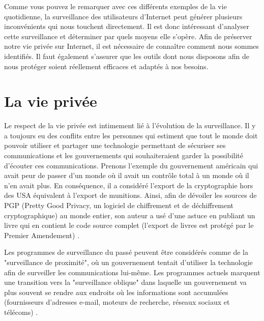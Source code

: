 Comme vous pouvez le remarquer avec ces différents exemples de la vie quotidienne, la surveillance des utilisateurs d'Internet peut générer plusieurs inconvénients qui nous touchent directement. Il est donc intéressant d'analyser cette surveillance et déterminer par quels moyens elle s'opère. Afin de préserver notre vie privée sur Internet, il est nécessaire de connaître comment nous sommes identifiés. Il faut également s'assurer que les outils dont nous disposons afin de nous protéger soient réellement efficaces et adaptés à nos besoins.


\section{La vie privée}
Le respect de la vie privée est intimement lié à l'évolution de la surveillance.
Il y a toujours eu des conflits entre les personnes qui estiment que tout le monde doit pouvoir utiliser et partager une technologie permettant de sécuriser ses communications et les gouvernements qui souhaiteraient garder la possibilité d'écouter ces communications. Prenons l'exemple du gouvernement américain qui avait peur de passer d'un monde où il avait un contrôle total à un monde où il n'en avait plus. En conséquence, il a considéré l'export de la cryptographie hors des USA équivalent à l'export de munitions. Ainsi, afin de dévoiler les sources de PGP (Pretty Good Privacy, un logiciel de chiffrement et de déchiffrement cryptographique) au monde entier, son auteur a usé d'une astuce en publiant un livre qui en contient le code source complet (l'export de livres est protégé par le Premier Amendement) \cite{youtube_moxie_marlinspike}.
\newline

Les programmes de surveillance du passé peuvent être considérés comme de la "surveillance de proximité", où un gouvernement tentait d'utiliser la technologie afin de surveiller les communications lui-même. Les programmes actuels marquent une transition vers la "surveillance oblique" dans laquelle un gouvernement va plus souvent se rendre aux endroits où les informations sont accumulées (fournisseurs d'adresses e-mail, moteurs de recherche, réseaux sociaux et télécoms) \cite{wired_nothing_to_hide}.
\newline

